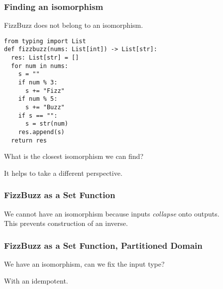 \documentclass{beamer}
\begin{document}
\begin{frame}[fragile]
\frametitle{Finding an isomorphism}

FizzBuzz does not belong to an isomorphism.
\medskip

\begin{verbatim}
from typing import List
def fizzbuzz(nums: List[int]) -> List[str]:
  res: List[str] = []
  for num in nums:
    s = ""
    if num % 3:
      s += "Fizz"
    if num % 5:
      s += "Buzz"
    if s == "":
      s = str(num)
    res.append(s)
  return res
\end{verbatim}

\pause
\medskip
What is the closest isomorphism we can find? \\
\medskip

It helps to take a different perspective.

\end{frame}

\begin{frame}[fragile]
\frametitle{FizzBuzz as a Set Function}
\medskip

We cannot have an isomorphism because inputs \emph{collapse} 
onto outputs. \\
This prevents construction of an inverse.
\end{frame}

\begin{frame}[fragile]
\frametitle{FizzBuzz as a Set Function, Partitioned Domain}
\medskip

We have an isomorphism, can we fix the input type? \\ \pause
\medskip

With an idempotent.
\end{frame}
\end{document}
